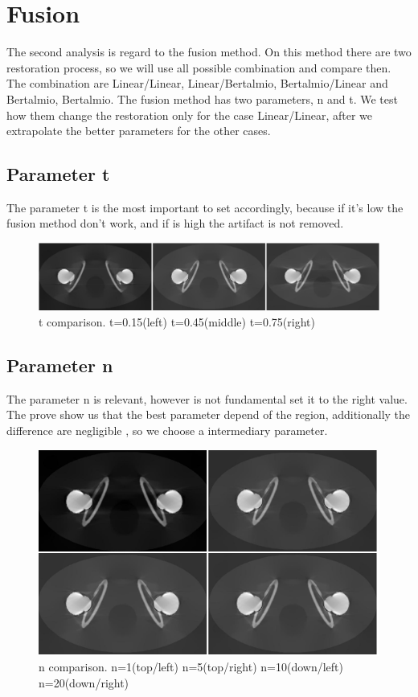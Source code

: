 \section{Fusion}

The second analysis is regard to the fusion method. On this method there are two restoration process, so we will use all possible combination and compare then. The combination are Linear/Linear, Linear/Bertalmio, Bertalmio/Linear and Bertalmio, Bertalmio.
The fusion method has two parameters, n and t. We test how them change the restoration only for the case Linear/Linear, after we extrapolate the better parameters for the other cases.

\subsection{Parameter t}

The parameter t is the most important to set accordingly, because if it's low the fusion method don't work, and if is high the artifact is not removed.

\begin{figure}[H]
\centering
\includegraphics[scale=0.5]{img/t_image}
\caption{{t comparison. t=0.15(left) t=0.45(middle) t=0.75(right)}}\label{t_image}
\end{figure}

\subsection{Parameter n}

The parameter n is relevant, however is not fundamental set it to the right value. The prove show us that the best parameter depend of the region, additionally the difference are negligible , so we choose a intermediary parameter.

\begin{figure}[H]
\centering
\includegraphics[scale=0.7]{img/n_image}
\caption{{n comparison. n=1(top/left) n=5(top/right) n=10(down/left) n=20(down/right)}}\label{n_image}
\end{figure}


